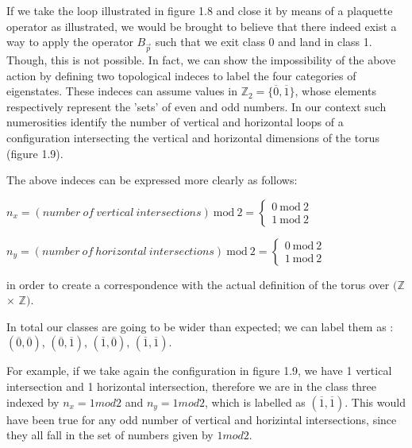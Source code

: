 \documentclass{Configuration_Files/PoliMi3i_thesis}
\begin{document}
If we take the loop illustrated in figure 1.8 and close it by means of a plaquette operator as illustrated, we would be brought to believe that there indeed exist a way to apply the operator $B_{\vec{p}} $ such that we exit class 0 and land in class 1. Though, this is not possible. \newline
In fact, we can show the impossibility of the above action by defining two topological indeces to label the four categories of eigenstates. These indeces can assume values in $\mathbb{Z}_2=\{\overline{0},\overline{1} \}$, whose elements respectively represent the 'sets' of even and odd numbers. In our context such numerosities identify the number of vertical and horizontal loops of a configuration intersecting the vertical and horizontal dimensions of the torus (figure 1.9).

The above indeces can be expressed more clearly as follows: 

\begin{center}
	$n_x= (number \ of \ vertical \ intersections) \ \mathrm{mod} \ 2 = 
	\begin{cases} 
		0 \ \mathrm{mod} \ 2 \\
		1 \ \mathrm{mod} \ 2  
	\end{cases}$ 
\end{center}
\begin{center}
	$n_y= (number \ of \ horizontal \ intersections) \ \mathrm{mod} \ 2 =\begin{cases} 
		0 \ \mathrm{mod} \ 2 \\
		1 \ \mathrm{mod} \ 2  
	\end{cases}$ 
\end{center}


in order to create a correspondence with the actual definition of the torus over $(\mathbb{Z}$ $\times$ $\mathbb{Z})$. 

In total our classes are going to be wider than expected; we can label them as : $(\overline{0},\overline{0} )$, $(\overline{0},\overline{1} )$, $(\overline{1},\overline{0})$, $(\overline{1},\overline{1})$.\newline

For example, if we take again the configuration in figure 1.9, we have 1 vertical intersection and 1 horizontal intersection, therefore we are in the class three indexed by $n_x=1mod2$ and $n_y=1mod2$, which is labelled as $(\overline{1},\overline{1})$. This would have been true for any odd number of vertical and horizintal intersections, since they all fall in the set of numbers given by $1mod2$.
\end{document}
